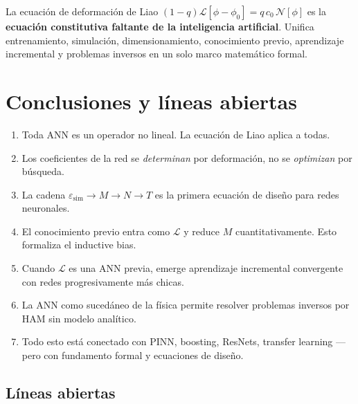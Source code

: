 \documentclass[11pt,a4paper]{article}
\begin{document}
\begin{resultado}
La ecuaci\'on de deformaci\'on de Liao $(1-q)\mathcal{L}[\phi - \phi_0] = q\,c_0\,\mathcal{N}[\phi]$ es la \textbf{ecuaci\'on constitutiva faltante de la inteligencia artificial}. Unifica entrenamiento, simulaci\'on, dimensionamiento, conocimiento previo, aprendizaje incremental y problemas inversos en un solo marco matem\'atico formal.
\end{resultado}


\section{Conclusiones y l\'ineas abiertas}

\begin{enumerate}
\item Toda ANN es un operador no lineal. La ecuaci\'on de Liao aplica a todas.

\item Los coeficientes de la red se \emph{determinan} por deformaci\'on, no se \emph{optimizan} por b\'usqueda.

\item La cadena $\varepsilon_{\mathrm{sim}} \to M \to N \to T$ es la primera ecuaci\'on de dise\~no para redes neuronales.

\item El conocimiento previo entra como $\mathcal{L}$ y reduce $M$ cuantitativamente. Esto formaliza el inductive bias.

\item Cuando $\mathcal{L}$ es una ANN previa, emerge aprendizaje incremental convergente con redes progresivamente m\'as chicas.

\item La ANN como suced\'aneo de la f\'isica permite resolver problemas inversos por HAM sin modelo anal\'itico.

\item Todo esto est\'a conectado con PINN, boosting, ResNets, transfer learning --- pero con fundamento formal y ecuaciones de dise\~no.
\end{enumerate}

\subsection{L\'ineas abiertas}
\end{document}
